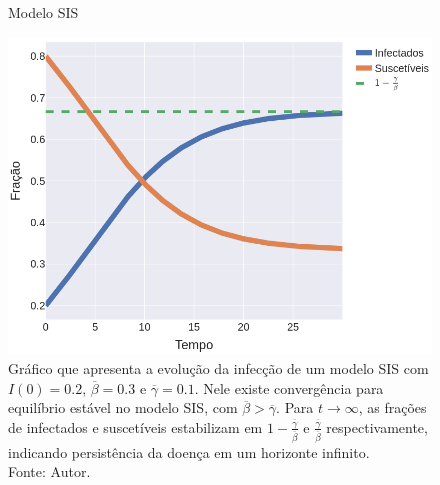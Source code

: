 \begin{figure}[H]
  \centering
  \captionsetup{font=normalsize,skip=1pt,singlelinecheck=on,labelsep=endash}
  \caption{Modelo SIS}
  \includegraphics[scale=0.4]{figuras/SIS_1.png}
   \caption*{Gráfico que apresenta a evolução da infecção de um modelo 
   SIS com $I(0) = 0.2$, $\overline{\beta} = 0.3$ e $\overline{\gamma} = 0.1$. Nele existe convergência para equilíbrio estável no modelo SIS, com $\overline{\beta} > \overline{\gamma}$. Para $t \rightarrow \infty$, as frações de infectados e suscetíveis estabilizam em $1 - \frac{\overline{\gamma}}{\overline{\beta}}$ e $\frac{\overline{\gamma}}{\overline{\beta}}$ respectivamente, indicando persistência da doença em um horizonte infinito.\\Fonte: Autor.}
   \label{SIS}
\end{figure}


